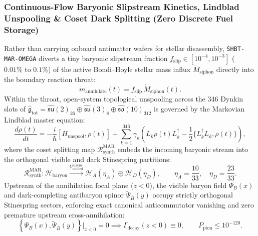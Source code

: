 \documentclass[11pt,onecolumn]{article}
\begin{document}
\subsubsection{Continuous-Flow Baryonic Slipstream Kinetics, Lindblad Unspooling \& Coset Dark Splitting (Zero Discrete Fuel Storage)}
Rather than carrying onboard antimatter wafers for stellar disassembly, \texttt{SHBT-MAR-OMEGA} diverts a tiny baryonic slipstream fraction $f_{\text{slip}} \in [10^{-4}, 10^{-3}]$ ($0.01\%\text{ to }0.1\%$) of the active Bondi--Hoyle stellar mass influx $\dot{M}_{\text{siphon}}$ directly into the boundary reaction throat:
\begin{equation}
\dot{m}_{\text{annihilate}}(t) = f_{\text{slip}}\,\dot{M}_{\text{siphon}}(t).
\label{eq:mar_omega_slipstream}
\end{equation}
Within the throat, open-system topological unspooling across the 346 Dynkin slots of $\hat{\mathfrak{g}}_{\text{tot}} = \hat{\mathfrak{su}}(2)_{26} \oplus \hat{\mathfrak{su}}(3)_8 \oplus \hat{\mathfrak{so}}(10)_{312}$ is governed by the Markovian Lindblad master equation:
\begin{equation}
\frac{d\rho(t)}{dt} = -\frac{i}{\hbar}[H_{\text{unspool}}, \rho(t)] + \sum_{k=1}^{346} \gamma_k \left( L_k \rho(t) L_k^\dagger - \frac{1}{2}\{L_k^\dagger L_k, \rho(t)\} \right),
\label{eq:mar_omega_lindblad_unspool}
\end{equation}
where the coset splitting map $\mathcal{R}_{\text{synth}}^{\text{MAR}}$ embeds the incoming baryonic stream into the orthogonal visible and dark Stinespring partitions:
\begin{equation}
\mathcal{R}_{\text{synth}}^{\text{MAR}}: \mathcal{H}_{\text{baryon}} \xrightarrow{V_{\text{unified}}^{\text{macro}}} \mathcal{H}_A(\eta_A) \oplus \mathcal{H}_D(\eta_D), \qquad \eta_A = \frac{10}{33}, \quad \eta_D = \frac{23}{33}.
\label{eq:mar_omega_coset_splitting}
\end{equation}
Upstream of the annihilation focal plane ($z < 0$), the visible baryon field $\Psi_B(x)$ and dark-completing antibaryon spinor $\tilde{\Psi}_{\bar{B}}(y)$ occupy strictly orthogonal Stinespring sectors, enforcing exact canonical anticommutator vanishing and zero premature upstream cross-annihilation:
\begin{equation}
\left\{\Psi_B(x), \tilde{\Psi}_{\bar{B}}(y)\right\}\Big|_{z<0} = 0 \implies \Gamma_{\text{decay}}(z < 0) \equiv 0, \qquad P_{\text{pion}} \le 10^{-120}.
\label{eq:mar_omega_upstream_orthogonality}
\end{equation}
\end{document}
